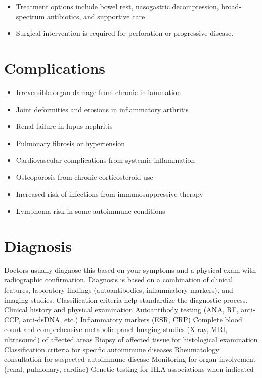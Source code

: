 \begin{itemize}[noitemsep]
  \item Treatment options include bowel rest, nasogastric decompression, broad-spectrum antibiotics, and supportive care
  \item Surgical intervention is required for perforation or progressive disease.
\end{itemize}
\section{Complications}
\begin{itemize}[noitemsep]
  \item Irreversible organ damage from chronic inflammation
  \item Joint deformities and erosions in inflammatory arthritis
  \item Renal failure in lupus nephritis
  \item Pulmonary fibrosis or hypertension
  \item Cardiovascular complications from systemic inflammation
  \item Osteoporosis from chronic corticosteroid use
  \item Increased risk of infections from immunosuppressive therapy
  \item Lymphoma risk in some autoimmune conditions
\end{itemize}
\section{Diagnosis}
Doctors usually diagnose this based on your symptoms and a physical exam with radiographic confirmation. Diagnosis is based on a combination of clinical features, laboratory findings (autoantibodies, inflammatory markers), and imaging studies. Classification criteria help standardize the diagnostic process. Clinical history and physical examination Autoantibody testing (ANA, RF, anti-CCP, anti-dsDNA, etc.) Inflammatory markers (ESR, CRP) Complete blood count and comprehensive metabolic panel Imaging studies (X-ray, MRI, ultrasound) of affected areas Biopsy of affected tissue for histological examination Classification criteria for specific autoimmune diseases Rheumatology consultation for suspected autoimmune disease Monitoring for organ involvement (renal, pulmonary, cardiac) Genetic testing for HLA associations when indicated

